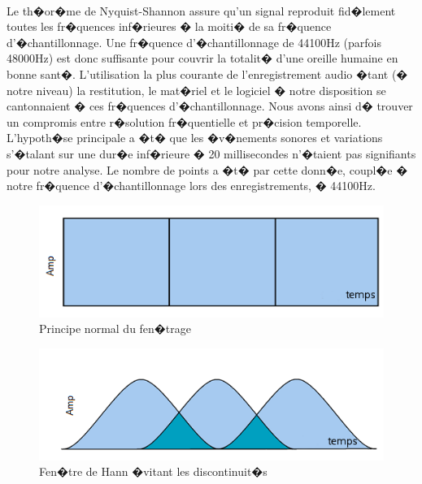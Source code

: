{\paragraph{}
  Le th�or�me de Nyquist-Shannon\cite{nyquistshannon} assure qu'un signal reproduit fid�lement toutes les fr�quences inf�rieures � la moiti� 
	de sa fr�quence d'�chantillonnage. Une fr�quence d'�chantillonnage de 44100Hz (parfois 48000Hz) est donc suffisante 
	pour couvrir la totalit� d'une oreille humaine en bonne sant�. L'utilisation la plus courante de l'enregistrement 
	audio �tant (� notre niveau) la restitution, le mat�riel et le logiciel � notre disposition se cantonnaient � ces 
	fr�quences d'�chantillonnage. Nous avons ainsi d� trouver un compromis entre r�solution fr�quentielle et pr�cision 
	temporelle. L'hypoth�se principale a �t� que les �v�nements sonores et variations s'�talant sur une dur�e inf�rieure 
	� 20 millisecondes n'�taient pas signifiants pour notre analyse. Le nombre de points a �t� par cette donn�e, coupl�e 
	� notre fr�quence d'�chantillonnage lors des enregistrements, � 44100Hz.
\begin{figure}[H]
	    \begin{center}
		    \includegraphics[width=12cm]{Images/fenetrenormale.png} 
	    \end{center}
	    \caption{Principe normal du fen�trage}
\end{figure}
\begin{figure}[H]
	    \begin{center}
		    \includegraphics[width=12cm]{Images/fenetrehann.png} 
	    \end{center}
	    \caption{Fen�tre de Hann �vitant les discontinuit�s}
\end{figure}
}
